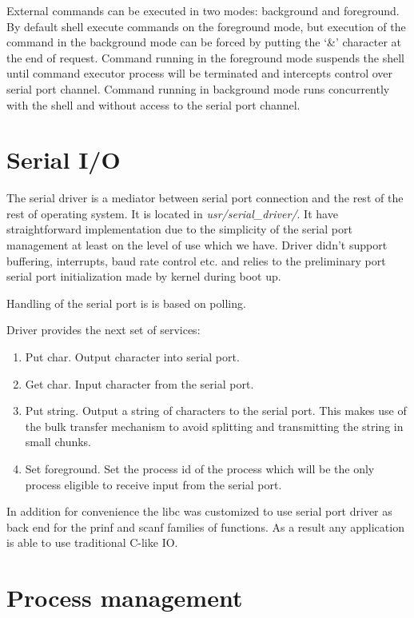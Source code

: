 \documentclass[a4paper,10pt]{article}
\newcommand{\filepath}[1]{\emph{ #1}}
\begin{document}
	External commands can be executed in two modes: background and foreground.
	By default shell execute commands on the foreground mode, but execution of the command in the background mode can be forced by putting the `\&' character at the end of request.
	Command running in the foreground mode suspends the shell until command executor process will be terminated and intercepts control over serial port channel.
	Command running in background mode runs concurrently with the shell and without access to the serial port channel.
    	    	
	 \section{Serial I/O}
	 	The serial driver is a mediator between serial port connection and the rest of the rest of operating system. It is located in \filepath{usr/serial\_driver/}.
	 	It have straightforward implementation due to the simplicity of the serial port management at least on the level of use which we have.
	 	Driver didn't support buffering, interrupts, baud rate control etc. and relies to the preliminary port serial port initialization made by kernel during boot up.
	 	
	 	Handling of the serial port is is based on polling.
		
		Driver provides the next set of services:
		\begin{enumerate}
			\item Put char. Output character into serial port.
			\item Get char. Input character from the serial port.
			\item Put string. Output a string of characters to the serial port. This makes use of the bulk transfer mechanism to avoid splitting and transmitting the string in small chunks.
			\item Set foreground. Set the process id of the process which will be the only process eligible to receive input from the serial port.
		\end{enumerate}
		
		In addition for convenience the libc was customized to use serial port driver as back end for the prinf and scanf families of functions.
		As a result any application is able to use traditional C-like IO.

\section{Process management}
\label{sec:process-management}
\end{document}
